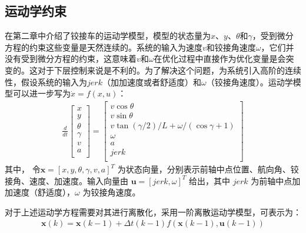 \documentclass[master,academic]{ysuthesis} %
\begin{document}
		\subsection{运动学约束}
		在第二章中介绍了铰接车的运动学模型，模型的状态量为$x$、$y$、$\theta$和$\gamma$，受到微分方程的约束这些变量是天然连续的。系统的输入为速度$v$和铰接角速度$\omega$，它们并没有受到微分方程的约束，这意味着$v$和$\omega$在优化过程中直接作为优化变量是会突变的。这对于下层控制来说是不利的。为了解决这个问题，为系统引入高阶的连续性，假设系统的输入为$jerk$（加加速度或者舒适度）和$\omega$（铰接角速度）。运动学模型可以进一步写为$\dot{x}=f( x,u )$：
		\begin{equation}
			\begin{aligned}
				 \frac{d}{dt}\left[ \begin{array}{c}
					x\\
					y\\
					\theta\\
					\gamma\\
					v\\
					a\\
				\end{array} \right] =\left[ \begin{array}{c}
					v\cos\theta\\
					v\sin\theta\\
					v\tan( \gamma /2 ) /L+\omega / (\cos\gamma +1 )\\
					\omega\\
					a\\
					jerk\\
				\end{array} \right] 
			\end{aligned}   
		\end{equation}
		其中， 令$\bm{x}=\left[ x,y,\theta,\gamma,v,a \right]^T$ 为状态向量，分别表示前轴中点位置、航向角、铰接角、速度、加速度。输入向量由 $\bm{u}=\left[jerk,\omega\right]^T$ 给出，其中 $jerk$ 为前轴中点加加速度（舒适度），$\omega$ 为铰接角速度。

		对于上述运动学方程需要对其进行离散化，采用一阶离散运动学模型，可表示为：
		\begin{equation}
			\begin{aligned}
				\bm{x}( k ) =\bm{x}( k-1 ) +\Delta t( k-1 ) f( \bm{x}( k-1 ) ,\bm{u}( k-1 ) ) 
			\end{aligned}   
		\end{equation}
\end{document}
